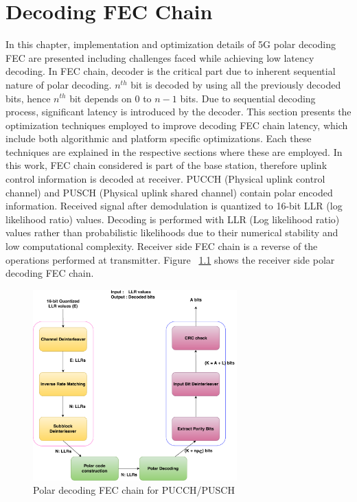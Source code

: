 \chapter{Decoding FEC Chain} \label{chap:DecodingChain}
In this chapter, implementation and optimization details of 5G polar decoding FEC are presented including challenges faced while achieving low latency decoding. In FEC chain, decoder is the critical part due to inherent sequential nature of polar decoding. $n^{th}$ bit is decoded by using all the previously decoded bits, hence $n^{th}$ bit depends on $0$ to $n-1$ bits. Due to sequential decoding process, significant latency is introduced by the decoder. This section presents the optimization techniques employed to improve decoding FEC chain latency, which include both algorithmic and platform specific optimizations. Each these techniques are explained in the respective sections where these are employed. In this work, FEC chain considered is part of the base station, therefore uplink control information is decoded at receiver. PUCCH (Physical uplink control channel) and PUSCH (Physical uplink shared channel) contain polar encoded information. Received signal after demodulation is quantized to 16-bit LLR (log likelihood ratio) values. Decoding is performed with LLR (Log likelihood ratio) values rather than probabilistic likelihoods due to their numerical stability and low computational complexity. Receiver side FEC chain is a reverse of the operations performed at transmitter. Figure ~\ref{fig:5grx_fec_chain} shows the receiver side polar decoding FEC chain.

\begin{figure}[]
	\centering
	\includegraphics[width=0.7\textwidth]{./figures/receiverFECChain_crc.pdf}
	\caption{Polar decoding FEC chain for PUCCH/PUSCH}
	\label{fig:5grx_fec_chain}
\end{figure}

